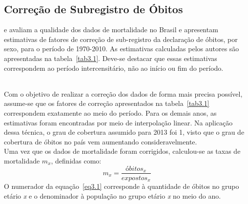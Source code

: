 \documentclass[12pt, 						%
			openright, 					%
			twoside,					%
			a4paper,x					%
			english,					%
			brazil]{abntex2}				%
\begin{document}
		\subsection{Correção de Subregistro de Óbitos \label{sec3.1.1}}
		 e  avaliam a qualidade dos dados de mortalidade no Brasil e apresentam estimativas de fatores de correção de sub-registro da declaração de óbitos, por sexo, para o período de 1970-2010. As estimativas calculadas pelos autores são apresentadas na tabela~\ref{tab3.1}. Deve-se destacar que essas estimativas correspondem ao período intercensitário, não ao início ou fim do período. \\
		\begin{table}[htb]
		\end{table} \\
		Com o objetivo de realizar a correção dos dados de forma mais precisa possível, assume-se que os fatores de correção apresentados na tabela~\ref{tab3.1} correspondem exatamente ao meio do período. Para os demais anos, as estimativas foram encontradas por meio de interpolação linear. Na aplicação dessa técnica, o grau de cobertura assumido para 2013 foi 1, visto que o grau de cobertura de óbitos no país vem aumentando consideravelmente.\\
		Uma vez que os dados de mortalidade foram corrigidos, calculou-se as taxas de mortalidade $m_{x}$, definidas como:
		\begin{equation} \label{eq3.1}
			m_{x} = \dfrac{óbitos_{x}}{expostos_{x}}
		\end{equation}
		O numerador da equação~\ref{eq3.1} corresponde à quantidade de óbitos no grupo etário \textit{x} e o denominador à população no grupo etário \textit{x} no meio do ano.
\end{document}

